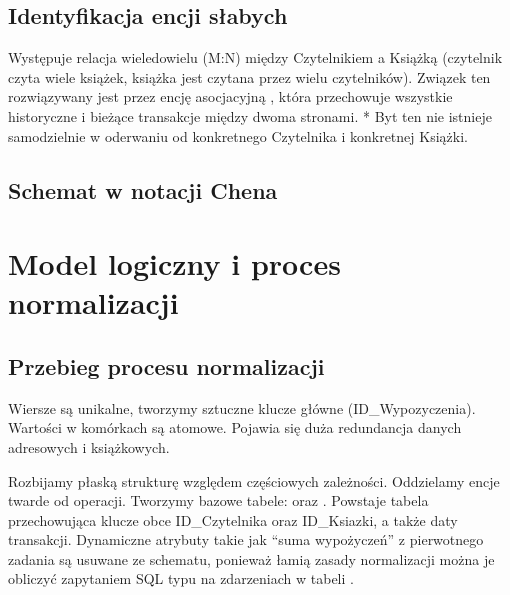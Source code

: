 \documentclass[a4paper,11pt,english,openany,oneside]{sphinxmanual}
\begin{document}
\subsection{Identyfikacja encji słabych}
\label{\detokenize{rozdzial_3/index:identyfikacja-encji-slabych}}
\sphinxAtStartPar
Występuje relacja wiele\sphinxhyphen{}do\sphinxhyphen{}wielu (M:N) między Czytelnikiem a Książką (czytelnik czyta wiele książek, książka jest czytana przez wielu czytelników). Związek ten rozwiązywany jest przez encję asocjacyjną , która przechowuje wszystkie historyczne i bieżące transakcje między dwoma stronami.
*  Byt ten nie istnieje samodzielnie w oderwaniu od konkretnego Czytelnika i konkretnej Książki.


\subsection{Schemat w notacji Chena}
\label{\detokenize{rozdzial_3/index:schemat-w-notacji-chena}}
\noindent{}


\section{Model logiczny i proces normalizacji}
\label{\detokenize{rozdzial_3/index:model-logiczny-i-proces-normalizacji}}

\subsection{Przebieg procesu normalizacji}
\label{\detokenize{rozdzial_3/index:przebieg-procesu-normalizacji}}
\sphinxAtStartPar
{}
Wiersze są unikalne, tworzymy sztuczne klucze główne (ID\_Wypozyczenia). Wartości w komórkach są atomowe. Pojawia się duża redundancja danych adresowych i książkowych.

\sphinxAtStartPar
{}
Rozbijamy płaską strukturę względem częściowych zależności. Oddzielamy encje twarde od operacji.
Tworzymy bazowe tabele:  oraz . Powstaje tabela  przechowująca klucze obce ID\_Czytelnika oraz ID\_Ksiazki, a także daty transakcji.
 Dynamiczne atrybuty takie jak “suma wypożyczeń” z pierwotnego zadania są usuwane ze schematu, ponieważ łamią zasady normalizacji \textendash{} można je obliczyć zapytaniem SQL typu  na zdarzeniach w tabeli .
\end{document}
